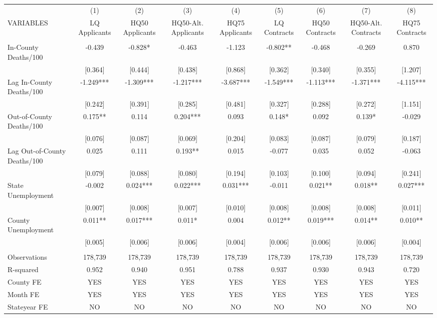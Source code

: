 \documentclass[]{article}
\begin{document}
\begin{tabular}{lcccccccc} \hline
 & (1) & (2) & (3) & (4) & (5) & (6) & (7) & (8) \\
VARIABLES & LQ Applicants & HQ50 Applicants & HQ50-Alt. Applicants & HQ75 Applicants & LQ Contracts & HQ50 Contracts & HQ50-Alt. Contracts & HQ75 Contracts \\ \hline
 &  &  &  &  &  &  &  &  \\
In-County Deaths/100 & -0.439 & -0.828* & -0.463 & -1.123 & -0.802** & -0.468 & -0.269 & 0.870 \\
 & [0.364] & [0.444] & [0.438] & [0.868] & [0.362] & [0.340] & [0.355] & [1.207] \\
Lag In-County Deaths/100 & -1.249*** & -1.309*** & -1.217*** & -3.687*** & -1.549*** & -1.113*** & -1.371*** & -4.115*** \\
 & [0.242] & [0.391] & [0.285] & [0.481] & [0.327] & [0.288] & [0.272] & [1.151] \\
Out-of-County Deaths/100 & 0.175** & 0.114 & 0.204*** & 0.093 & 0.148* & 0.092 & 0.139* & -0.029 \\
 & [0.076] & [0.087] & [0.069] & [0.204] & [0.083] & [0.087] & [0.079] & [0.187] \\
Lag Out-of-County Deaths/100 & 0.025 & 0.111 & 0.193** & 0.015 & -0.077 & 0.035 & 0.052 & -0.063 \\
 & [0.079] & [0.088] & [0.080] & [0.194] & [0.103] & [0.100] & [0.094] & [0.241] \\
State Unemployment & -0.002 & 0.024*** & 0.022*** & 0.031*** & -0.011 & 0.021** & 0.018** & 0.027*** \\
 & [0.007] & [0.008] & [0.007] & [0.010] & [0.008] & [0.008] & [0.008] & [0.011] \\
County Unemployment & 0.011** & 0.017*** & 0.011* & 0.004 & 0.012** & 0.019*** & 0.014** & 0.010** \\
 & [0.005] & [0.006] & [0.006] & [0.004] & [0.006] & [0.006] & [0.006] & [0.004] \\
 &  &  &  &  &  &  &  &  \\
Observations & 178,739 & 178,739 & 178,739 & 178,739 & 178,739 & 178,739 & 178,739 & 178,739 \\
R-squared & 0.952 & 0.940 & 0.951 & 0.788 & 0.937 & 0.930 & 0.943 & 0.720 \\
County FE & YES & YES & YES & YES & YES & YES & YES & YES \\
Month FE & YES & YES & YES & YES & YES & YES & YES & YES \\
 Stateyear FE & NO & NO & NO & NO & NO & NO & NO & NO \\ \hline

\end{tabular}
\end{document}
